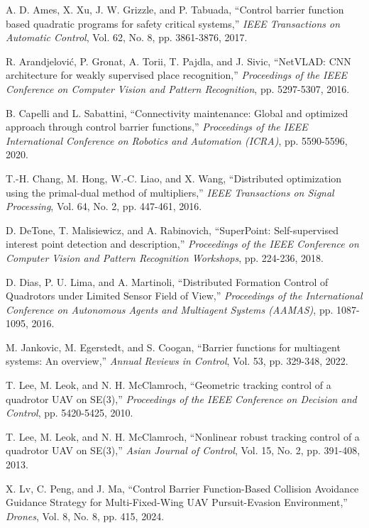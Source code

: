 \begin{thebibliography}{99}
 A. D. Ames, X. Xu, J. W. Grizzle, and P. Tabuada, ``Control barrier function based quadratic programs for safety critical systems,'' {\it IEEE Transactions on Automatic Control}, Vol. 62, No. 8, pp. 3861-3876, 2017.

 R. Arandjelović, P. Gronat, A. Torii, T. Pajdla, and J. Sivic, ``NetVLAD: CNN architecture for weakly supervised place recognition,'' {\it Proceedings of the IEEE Conference on Computer Vision and Pattern Recognition}, pp. 5297-5307, 2016.

 B. Capelli and L. Sabattini, ``Connectivity maintenance: Global and optimized approach through control barrier functions,'' {\it Proceedings of the IEEE International Conference on Robotics and Automation (ICRA)}, pp. 5590-5596, 2020.

 T.-H. Chang, M. Hong, W.-C. Liao, and X. Wang, ``Distributed optimization using the primal-dual method of multipliers,'' {\it IEEE Transactions on Signal Processing}, Vol. 64, No. 2, pp. 447-461, 2016.

 D. DeTone, T. Malisiewicz, and A. Rabinovich, ``SuperPoint: Self-supervised interest point detection and description,'' {\it Proceedings of the IEEE Conference on Computer Vision and Pattern Recognition Workshops}, pp. 224-236, 2018.

 D. Dias, P. U. Lima, and A. Martinoli, ``Distributed Formation Control of Quadrotors under Limited Sensor Field of View,'' {\it Proceedings of the International Conference on Autonomous Agents and Multiagent Systems (AAMAS)}, pp. 1087-1095, 2016.

 M. Jankovic, M. Egerstedt, and S. Coogan, ``Barrier functions for multiagent systems: An overview,'' {\it Annual Reviews in Control}, Vol. 53, pp. 329-348, 2022.

 T. Lee, M. Leok, and N. H. McClamroch, ``Geometric tracking control of a quadrotor UAV on SE(3),'' {\it Proceedings of the IEEE Conference on Decision and Control}, pp. 5420-5425, 2010.

 T. Lee, M. Leok, and N. H. McClamroch, ``Nonlinear robust tracking control of a quadrotor UAV on SE(3),'' {\it Asian Journal of Control}, Vol. 15, No. 2, pp. 391-408, 2013.

 X. Lv, C. Peng, and J. Ma, ``Control Barrier Function-Based Collision Avoidance Guidance Strategy for Multi-Fixed-Wing UAV Pursuit-Evasion Environment,'' {\it Drones}, Vol. 8, No. 8, pp. 415, 2024.


\end{thebibliography}
